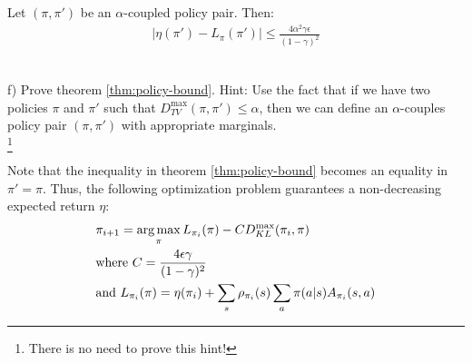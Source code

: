 \begin{lemma}
    Let $(\pi, \pi')$ be an $\alpha$-coupled policy pair. Then:
    \begin{align*}
        |\eta(\pi')-L_{\pi}(\pi')| \le \frac{4\alpha^2\gamma\epsilon}{(1-\gamma)^2}
    \end{align*}
\end{lemma}\\
{}
\newpage
f) Prove theorem \ref{thm:policy-bound}. Hint: Use the fact that if we have two policies $\pi$ and $\pi'$ such that $D_{TV}^{\max} (\pi, \pi') \le \alpha$, then we can define an $\alpha$-couples policy pair $(\pi, \pi')$ with appropriate marginals.\\
{}
\footnote{There is no need to prove this hint!}


Note that the inequality in theorem \ref{thm:policy-bound} becomes an equality in $\pi' = \pi$. Thus, the following optimization problem guarantees a non-decreasing expected return $\eta$:
\begin{align*}
    &\pi_{i + 1} = \operatorname*{arg\,max}_{\pi} L_{\pi_i}(\pi) - CD_{KL}^{\max}(\pi_i, \pi)\\
    &\text{where } C = \frac{4\epsilon\gamma}{(1-\gamma)^2}\\
    &\text{and } L_{\pi_i}(\pi) = \eta(\pi_i) + \sum_{s}\rho_{\pi_i}(s)\sum_{a}\pi(a|s)A_{\pi_i}(s, a)
\end{align*}

